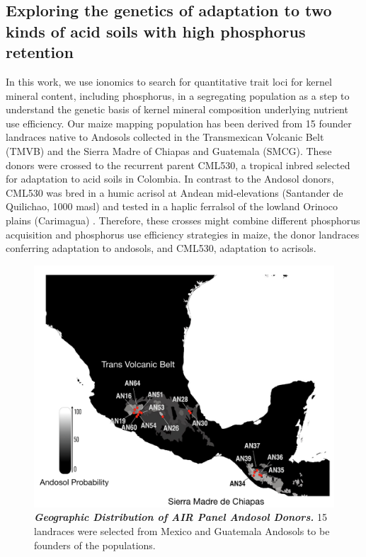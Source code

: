\subsection{Exploring the genetics of adaptation to two kinds of acid soils with high phosphorus retention}
In this work, we use ionomics to search for quantitative trait loci for kernel mineral content, including phosphorus, in a segregating population as a step to understand the genetic basis of kernel mineral composition underlying nutrient use efficiency.
Our maize mapping population has been derived from 15 founder landraces native to  Andosols collected in the Transmexican Volcanic Belt (TMVB) and the Sierra Madre of Chiapas and Guatemala (SMCG).
These donors were crossed to the recurrent parent  CML530, a tropical inbred selected for adaptation to acid soils in Colombia.
In contrast to the Andosol donors, CML530 was bred in a humic acrisol at Andean mid-elevations (Santander de Quilichao, 1000 masl) and tested in a haplic ferralsol of the lowland Orinoco plains (Carimagua) \citep{granados1995}.
Therefore, these crosses might combine different phosphorus acquisition and phosphorus use efficiency strategies in maize, the donor landraces conferring adaptation to andosols, and CML530, adaptation to acrisols.

\begin{figure}[!ht]
\centering
\includegraphics[width=\linewidth]{Chapter-4/figs/parentmap.png}
\caption[Geographic Distribution of AIR Panel Andosol Founders]
{\textit{\textbf{Geographic Distribution of AIR Panel Andosol Donors.}}
15 landraces were selected from Mexico and Guatemala Andosols to be founders of the populations.}
\label{fig::parentmap}
\end{figure}

